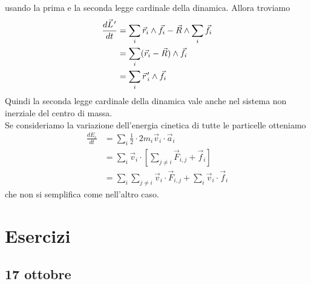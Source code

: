 \documentclass[a4paper]{article}
\begin{document}
usando la prima e la seconda legge cardinale della dinamica.
Allora troviamo
\begin{align*}
    \frac{d\pvec{L}'}{dt} &= \sum_i \vec{r}_i \wedge \vec{f}_i
    - \vec{R} \wedge \sum_i \vec{f}_i \\
    &= \sum_i (\vec{r}_i - \vec{R}) \wedge \vec{f}_i \\
    &= \sum_i \pvec{r}_i' \wedge \vec{f}_i
\end{align*}
Quindi la seconda legge cardinale della dinamica vale anche nel sistema non inerziale
del centro di massa.
\\
Se consideriamo la variazione dell'energia cinetica di tutte le particelle otteniamo
\begin{align*}
    \frac{dE_c}{dt} &= \sum_i \frac{1}{2} \cdot 2 m_i \vec{v}_i \cdot \vec{a}_i \\
    &= \sum_i \vec{v}_i \cdot \left[
        \sum_{j\neq i} \vec{F}_{i,j} + \vec{f}_i
    \right] \\
    &= \sum_i \sum_{j\neq i} \vec{v}_i \cdot \vec{F}_{i,j} + \sum_i \vec{v}_i \cdot \vec{f}_i
\end{align*}
che non si semplifica come nell'altro caso.

\pagebreak

\section{Esercizi}

\subsection{17 ottobre}

\end{document}

